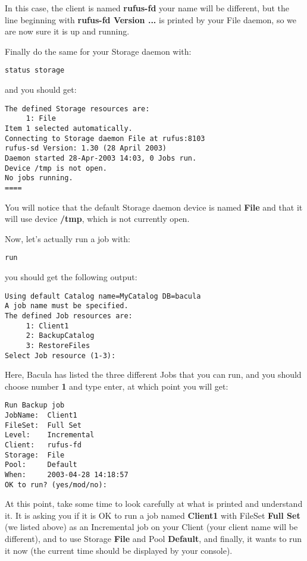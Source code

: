{{In this case, the client is named {\bf rufus-fd} your name will be different,
but the line beginning with {\bf rufus-fd Version ...} is printed by your File
daemon, so we are now sure it is up and running. 

Finally do the same for your Storage daemon with: 

\footnotesize
\begin{verbatim}
status storage
\end{verbatim}
\normalsize

and you should get: 

\footnotesize
\begin{verbatim}
The defined Storage resources are:
     1: File
Item 1 selected automatically.
Connecting to Storage daemon File at rufus:8103
rufus-sd Version: 1.30 (28 April 2003)
Daemon started 28-Apr-2003 14:03, 0 Jobs run.
Device /tmp is not open.
No jobs running.
====
\end{verbatim}
\normalsize

You will notice that the default Storage daemon device is named {\bf File} and
that it will use device {\bf /tmp}, which is not currently open. 

Now, let's actually run a job with: 

\footnotesize
\begin{verbatim}
run
\end{verbatim}
\normalsize

you should get the following output: 

\footnotesize
\begin{verbatim}
Using default Catalog name=MyCatalog DB=bacula
A job name must be specified.
The defined Job resources are:
     1: Client1
     2: BackupCatalog
     3: RestoreFiles
Select Job resource (1-3):
\end{verbatim}
\normalsize

Here, Bacula has listed the three different Jobs that you can run, and you
should choose number {\bf 1} and type enter, at which point you will get: 

\footnotesize
\begin{verbatim}
Run Backup job
JobName:  Client1
FileSet:  Full Set
Level:    Incremental
Client:   rufus-fd
Storage:  File
Pool:     Default
When:     2003-04-28 14:18:57
OK to run? (yes/mod/no):
\end{verbatim}
\normalsize

At this point, take some time to look carefully at what is printed and
understand it. It is asking you if it is OK to run a job named {\bf Client1}
with FileSet {\bf Full Set} (we listed above) as an Incremental job on your
Client (your client name will be different), and to use Storage {\bf File} and
Pool {\bf Default}, and finally, it wants to run it now (the current time
should be displayed by your console). 

}}
